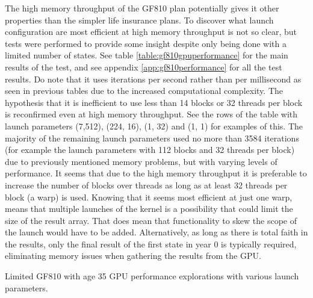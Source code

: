 The high memory throughput of the GF810 plan potentially gives it other properties than the simpler life insurance plans.
To discover what launch configuration are most efficient at high memory throughput is not so clear, but tests were performed to provide some insight despite only being done with a limited number of states.
See table \ref{table:gf810gpuperformance} for the main results of the test, and see appendix \ref{app:gf810performance} for all the test results.
Do note that it uses iterations per second rather than per millisecond as seen in previous tables due to the increased computational complexity.
The hypothesis that it is inefficient to use less than 14 blocks or 32 threads per block is reconfirmed even at high memory throughput.
See the rows of the table with launch parameters (7,512), (224, 16), (1, 32) and (1, 1) for examples of this.
The majority of the remaining launch parameters used no more than 3584 iterations (for example the launch parameters with 112 blocks and 32 threads per block) due to previously mentioned memory problems, but with varying levels of performance.
It seems that due to the high memory throughput it is preferable to increase the number of blocks over threads as long as at least 32 threads per block (a warp) is used.
Knowing that it seems most efficient at just one warp, means that multiple launches of the kernel is a possibility that could limit the size of the result array.
That does mean that functionality to skew the scope of the launch would have to be added.
Alternatively, as long as there is total faith in the results, only the final result of the first state in year 0 is typically required, eliminating memory issues when gathering the results from the GPU.

\begin{table}[h!]
\centering
{}
\caption{Limited GF810 with age 35 GPU performance explorations with various launch parameters.\label{table:gf810gpuperformance}}
\caption*{Launch parameters are of the form (blocks, threads per block). Kernel time is in seconds.}
\end{table}

